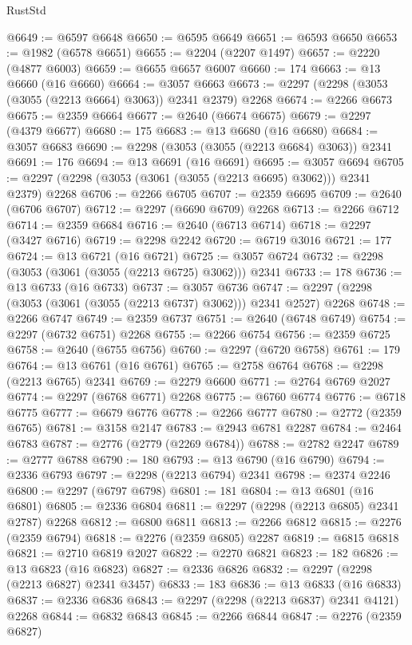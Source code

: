 \begin{lexlean}{RustStd}
\begin{coremodule}
@6649 := @6597 @6648
@6650 := @6595 @6649
@6651 := @6593 @6650
@6653 := @1982 (@6578 @6651)
@6655 := @2204 (@2207 @1497)
@6657 := @2220 (@4877 @6003)
@6659 := @6655 @6657 @6007
@6660 := 174
@6663 := @13 @6660 (@16 @6660)
@6664 := @3057 @6663
@6673 := @2297 (@2298 (@3053 (@3055 (@2213 @6664) @3063)) @2341 @2379) @2268
@6674 := @2266 @6673
@6675 := @2359 @6664
@6677 := @2640 (@6674 @6675)
@6679 := @2297 (@4379 @6677)
@6680 := 175
@6683 := @13 @6680 (@16 @6680)
@6684 := @3057 @6683
@6690 := @2298 (@3053 (@3055 (@2213 @6684) @3063)) @2341
@6691 := 176
@6694 := @13 @6691 (@16 @6691)
@6695 := @3057 @6694
@6705 := @2297 (@2298 (@3053 (@3061 (@3055 (@2213 @6695) @3062))) @2341 @2379) @2268
@6706 := @2266 @6705
@6707 := @2359 @6695
@6709 := @2640 (@6706 @6707)
@6712 := @2297 (@6690 @6709) @2268
@6713 := @2266 @6712
@6714 := @2359 @6684
@6716 := @2640 (@6713 @6714)
@6718 := @2297 (@3427 @6716)
@6719 := @2298 @2242
@6720 := @6719 @3016
@6721 := 177
@6724 := @13 @6721 (@16 @6721)
@6725 := @3057 @6724
@6732 := @2298 (@3053 (@3061 (@3055 (@2213 @6725) @3062))) @2341
@6733 := 178
@6736 := @13 @6733 (@16 @6733)
@6737 := @3057 @6736
@6747 := @2297 (@2298 (@3053 (@3061 (@3055 (@2213 @6737) @3062))) @2341 @2527) @2268
@6748 := @2266 @6747
@6749 := @2359 @6737
@6751 := @2640 (@6748 @6749)
@6754 := @2297 (@6732 @6751) @2268
@6755 := @2266 @6754
@6756 := @2359 @6725
@6758 := @2640 (@6755 @6756)
@6760 := @2297 (@6720 @6758)
@6761 := 179
@6764 := @13 @6761 (@16 @6761)
@6765 := @2758 @6764
@6768 := @2298 (@2213 @6765) @2341
@6769 := @2279 @6600
@6771 := @2764 @6769 @2027
@6774 := @2297 (@6768 @6771) @2268
@6775 := @6760 @6774
@6776 := @6718 @6775
@6777 := @6679 @6776
@6778 := @2266 @6777
@6780 := @2772 (@2359 @6765)
@6781 := @3158 @2147
@6783 := @2943 @6781 @2287
@6784 := @2464 @6783
@6787 := @2776 (@2779 (@2269 @6784))
@6788 := @2782 @2247
@6789 := @2777 @6788
@6790 := 180
@6793 := @13 @6790 (@16 @6790)
@6794 := @2336 @6793
@6797 := @2298 (@2213 @6794) @2341
@6798 := @2374 @2246
@6800 := @2297 (@6797 @6798)
@6801 := 181
@6804 := @13 @6801 (@16 @6801)
@6805 := @2336 @6804
@6811 := @2297 (@2298 (@2213 @6805) @2341 @2787) @2268
@6812 := @6800 @6811
@6813 := @2266 @6812
@6815 := @2276 (@2359 @6794)
@6818 := @2276 (@2359 @6805) @2287
@6819 := @6815 @6818
@6821 := @2710 @6819 @2027
@6822 := @2270 @6821
@6823 := 182
@6826 := @13 @6823 (@16 @6823)
@6827 := @2336 @6826
@6832 := @2297 (@2298 (@2213 @6827) @2341 @3457)
@6833 := 183
@6836 := @13 @6833 (@16 @6833)
@6837 := @2336 @6836
@6843 := @2297 (@2298 (@2213 @6837) @2341 @4121) @2268
@6844 := @6832 @6843
@6845 := @2266 @6844
@6847 := @2276 (@2359 @6827)

\end{coremodule}
\end{lexlean}
